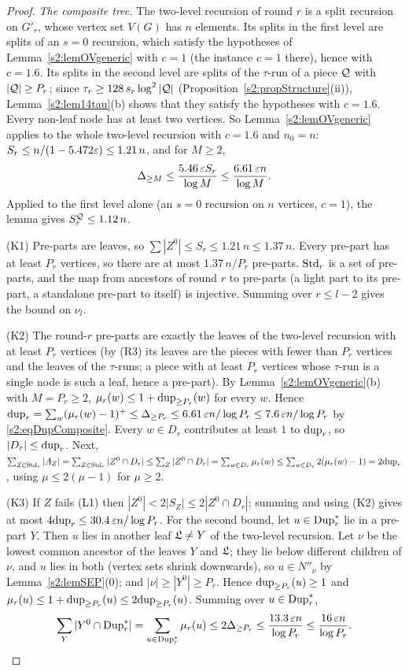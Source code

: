 \begin{proof}
\emph{The composite tree.} The two-level recursion of round $r$ is a split
recursion on $G'_r$, whose vertex set $V(G)$ has $n$ elements. Its splits in the
first level are splits of an $s=0$ recursion, which satisfy the hypotheses of
Lemma~\ref{s2:lemOVgeneric} with $c=1$ (the instance $c=1$ there), hence with
$c=1.6$. Its splits in the second level are splits of the $\tau$-run of a piece
$\mathcal{Q}$ with $|\mathcal{Q}|\ge P_r$; since $\tau_r\ge128\,s_r\log^2|\mathcal{Q}|$
(Proposition~\ref{s2:propStructure}(ii)), Lemma~\ref{s2:lem14tau}(b) shows that
they satisfy the hypotheses with $c=1.6$. Every non-leaf node has at least two
vertices. So Lemma~\ref{s2:lemOVgeneric} applies to the whole two-level
recursion with $c=1.6$ and $n_0=n$: $S_r\le n/(1-5.472\varepsilon)\le1.21\,n$, and for
$M\ge2$,
\begin{equation}\label{s2:eqDupComposite}
\Delta_{\ge M}\le\frac{5.46\,\varepsilon S_r}{\log M}\le\frac{6.61\,\varepsilon n}{\log M}.
\end{equation}
Applied to the first level alone (an $s=0$ recursion on $n$ vertices, $c=1$),
the lemma gives $S^{\mathcal{Q}}_r\le1.12\,n$.

(K1) Pre-parts are leaves, so $\sum|Z^0|\le S_r\le1.21\,n\le1.37\,n$. Every
pre-part has at least $P_r$ vertices, so there are at most $1.37\,n/P_r$
pre-parts. $\mathrm{Std}_r$ is a set of pre-parts, and the map from ancestors of round
$r$ to pre-parts (a light part to its pre-part, a standalone pre-part to
itself) is injective. Summing over $r\le l-2$ gives the bound on $\nu_l$.

(K2) The round-$r$ pre-parts are exactly the leaves of the two-level recursion
with at least $P_r$ vertices (by (R3) its leaves are the pieces with fewer than
$P_r$ vertices and the leaves of the $\tau$-runs; a piece with at least $P_r$
vertices whose $\tau$-run is a single node is such a leaf, hence a pre-part). By
Lemma~\ref{s2:lemOVgeneric}(b) with $M=P_r\ge2$, $\mu_r(w)\le1+\mathrm{dup}_{\ge
P_r}(w)$ for every $w$. Hence $\mathrm{dup}_r=\sum_w(\mu_r(w)-1)^+\le\Delta_{\ge P_r}\le
6.61\,\varepsilon n/\log P_r\le7.6\,\varepsilon n/\log P_r$ by \eqref{s2:eqDupComposite}.
Every $w\in D_r$ contributes at least $1$ to $\mathrm{dup}_r$, so $|D_r|\le\mathrm{dup}_r$.
Next, $\sum_{Z\in\mathrm{Std}_r}|A_Z|=\sum_{Z\in\mathrm{Std}_r}|Z^0\cap D_r|\le\sum_Z|Z^0\cap
D_r|=\sum_{w\in D_r}\mu_r(w)\le\sum_{w\in D_r}2(\mu_r(w)-1)=2\mathrm{dup}_r$, using
$\mu\le2(\mu-1)$ for $\mu\ge2$.

(K3) If $Z$ fails (L1) then $|Z^0|<2|S_Z|\le2|Z^0\cap D_r|$; summing and using
(K2) gives at most $4\mathrm{dup}_r\le30.4\,\varepsilon n/\log P_r$. For the second bound, let
$u\in\mathrm{Dup}^{*}_r$ lie in a pre-part $Y$. Then $u$ lies in another leaf $\mathfrak{L}\ne Y$
of the two-level recursion. Let $\nu$ be the lowest common ancestor of the
leaves $Y$ and $\mathfrak{L}$; they lie below different children of $\nu$, and $u$
lies in both (vertex sets shrink downwards), so $u\in N''_\nu$ by
Lemma~\ref{s2:lemSEP}(0); and $|\nu|\ge|Y^0|\ge P_r$. Hence
$\mathrm{dup}_{\ge P_r}(u)\ge1$ and $\mu_r(u)\le1+\mathrm{dup}_{\ge P_r}(u)\le2\mathrm{dup}_{\ge
P_r}(u)$. Summing over $u\in\mathrm{Dup}^{*}_r$,
\[
\sum_Y|Y^0\cap\mathrm{Dup}^{*}_r|=\sum_{u\in\mathrm{Dup}^{*}_r}\mu_r(u)\le2\Delta_{\ge P_r}
\le\frac{13.3\,\varepsilon n}{\log P_r}\le\frac{16\,\varepsilon n}{\log P_r}.
\]


\end{proof}
